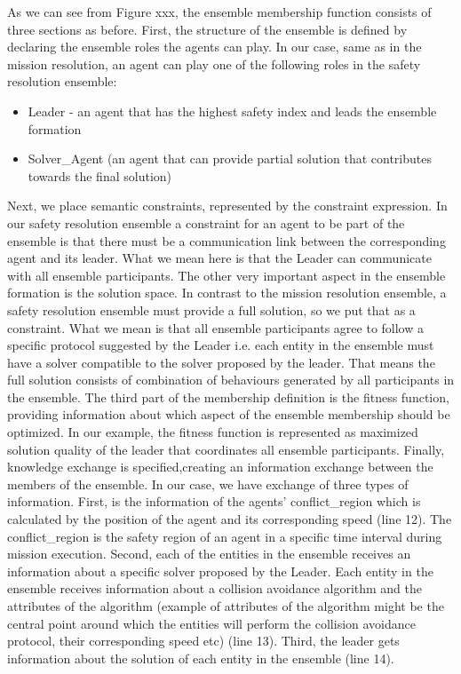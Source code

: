\documentclass[journal]{IEEEtran}
\theoremstyle{definition}
\begin{document}
As we can see from Figure xxx,
the  ensemble  membership  function  consists  of  three  sections as before. First, the structure of the ensemble is defined by declaring the ensemble roles the agents can play. In  our  case, same as in the mission resolution, an  agent  can  play one  of  the  following  roles in the safety resolution ensemble:
\begin{itemize}
\item Leader - an agent that has the highest safety index and leads the ensemble formation
\item Solver\_Agent  (an  agent  that  can provide partial solution that contributes towards the final solution)
\end{itemize}
Next,  we  place  semantic  constraints,  represented  by  the constraint  expression.  In  our  safety resolution ensemble a  constraint  for  an agent  to  be  part of  the  ensemble  is  that  there  must  be  a communication  link between  the  corresponding  agent  and its  leader.  What  we  mean  here  is  that the Leader can communicate with all ensemble participants. The other very important aspect in the ensemble formation is the solution space. In contrast to the mission resolution ensemble, a safety resolution ensemble must provide a full solution, so we put that as a constraint. What we mean is that all ensemble participants agree to follow a specific protocol suggested by the Leader i.e. each entity in the ensemble must have a solver compatible to the solver proposed by the leader. That means the full solution consists of combination of behaviours generated by all participants in the ensemble.
The third part of the membership definition  is  the  fitness  function, providing  information  about which  aspect  of  the  ensemble  membership  should  be  optimized. In  our  example,  the  fitness  function  is represented as maximized solution quality of the leader that coordinates all ensemble participants. 
Finally, knowledge exchange is specified,creating an information exchange between the members of the ensemble.  In  our  case,  we  have  exchange  of  three  types  of information.  First,  is  the  information  of the agents' conflict\_region which is calculated by the position of the agent and its corresponding speed 
(line 12). The conflict\_region is the safety region of an agent in a specific time interval during mission execution. Second, each of the entities in the  ensemble receives an information about a specific solver proposed by the Leader. Each entity in the ensemble receives information about a collision avoidance algorithm and the attributes of the algorithm (example of attributes of the algorithm might be the central point around which the entities will perform the collision avoidance protocol,  their corresponding speed etc) (line 13).
Third, the leader gets information about the solution  of each entity in the ensemble (line 14).
\end{document}
